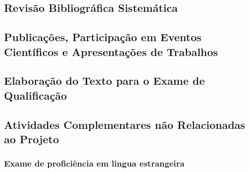 \documentclass[a4paper,11pt]{article}
\begin{document}
	 	

	 \subsection{Revisão Bibliográfica Sistemática} %
	 \label{sub:revis_o_bibliogr_fica_sistem_tica}
	 	
	 	
	 

	 \subsection{Publicações, Participação em Eventos Científicos e Apresentações de Trabalhos} %
	 \label{sub:publica_es_participa_o_em_eventos_cient_ficos_e_apresenta_es_de_trabalhos}
	 
	 	

	 \subsection{Elaboração do Texto para o Exame de Qualificação} %
	 \label{sub:elabora_o_do_texto_para_o_exame_de_qualifica_o}
	 
	 	


	 \subsection{Atividades Complementares não Relacionadas ao Projeto} %
	 \label{sub:atividades_complementares_n_o_relacionadas_ao_projeto}
	 
	 

	 \subsubsection{Exame de proficiência em lingua estrangeira} %
	 \label{sub:exame_de_profici_ncia_em_lingua_estrangeira}
	 
	 	
\end{document}
